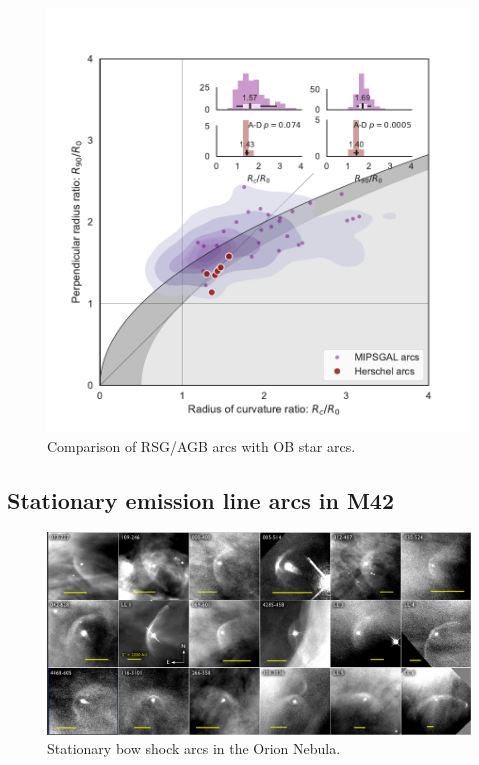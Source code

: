 \begin{figure}
  \centering
  \includegraphics[width=\linewidth]{figs/mipsgal-Rc-R90-vs-Herschel}
  \caption[]{Comparison of RSG/AGB arcs with OB star arcs.}
  \label{fig:herschel-compare-mipsgal}
\end{figure}



\subsection{Stationary emission line arcs in M42}
\label{sec:stat-emiss-line}

\begin{figure}
  \centering
  \includegraphics[width=\textwidth]{figs/annotated-ll-arcs}
  \caption[]{Stationary bow shock arcs in the Orion Nebula.}
  \label{fig:ll-arcs}
\end{figure}

